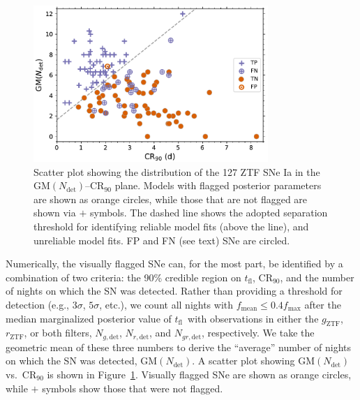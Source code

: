 \documentclass[twocolumn]{aastex63}
\newcommand{\rztf}{$r_\mathrm{ZTF}$}
\newcommand{\gztf}{$g_\mathrm{ZTF}$}
\newcommand{\tfl}{$t_\mathrm{fl}$}
\begin{document}
\begin{figure}
    \centering
    \includegraphics[width=3.5in]{./figures/final_sample.pdf}
    \caption{Scatter plot showing the distribution of the 127 ZTF SNe Ia in
    the $\mathrm{GM}(N_\mathrm{det})$--$\mathrm{CR}_{90}$ plane. Models with
    flagged posterior parameters are shown as orange circles, while those
    that are not flagged are shown via $+$ symbols. The dashed line shows the
    adopted separation threshold for identifying reliable model fits (above
    the line), and unreliable model fits. FP and FN (see text) SNe are
    circled. }
    \label{fig:flagged_sn}
\end{figure}

Numerically, the visually flagged SNe can, for the most part, be identified
by a combination of two criteria: the 90\% credible region on \tfl,
$\mathrm{CR}_{90}$, and the number of nights on which the SN was detected.
Rather than providing a threshold for detection (e.g., $3\sigma$, $5\sigma$,
etc.), we count all nights with $f_\mathrm{mean} \le 0.4 f_\mathrm{max}$
after the median marginalized posterior value of \tfl\ with observations in
either the \gztf, \rztf, or both filters, $N_{g, \mathrm{det}}$, $N_{r,
\mathrm{det}}$, and $N_{gr, \mathrm{det}}$, respectively. We take the
geometric mean of these three numbers to derive the ``average'' number of
nights on which the SN was detected, $\mathrm{GM}(N_\mathrm{det})$. A scatter
plot showing $\mathrm{GM}(N_\mathrm{det})$ vs.\ $\mathrm{CR}_{90}$ is shown
in Figure~\ref{fig:flagged_sn}. Visually flagged SNe are shown as orange
circles, while $+$ symbols show those that were not flagged.
\end{document}
